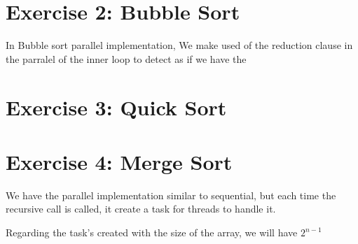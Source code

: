\documentclass{article}
\begin{document}
\section{Exercise 2: Bubble Sort}
In Bubble sort parallel implementation, We make used of the reduction clause in the parralel of the inner loop to detect as if we have the 
\section{Exercise 3: Quick Sort}
\section{Exercise 4: Merge Sort}
We have the parallel implementation similar to sequential, but each time the recursive call is called, it create a task for threads to handle it.

Regarding the task's created with the size of the array, we will have $2^{n-1}$
\end{document}
